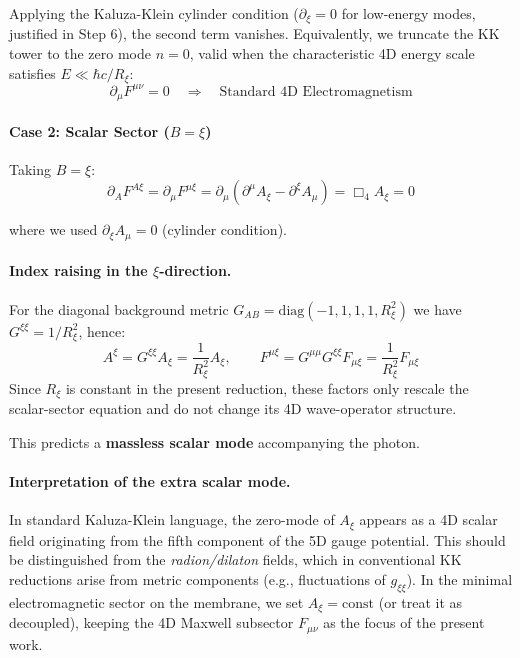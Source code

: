 Applying the Kaluza-Klein cylinder condition ($\partial_\xi = 0$ for low-energy modes, justified in Step 6), the second term vanishes. Equivalently, we truncate the KK tower to the zero mode $n=0$, valid when the characteristic 4D energy scale satisfies $E \ll \hbar c / R_\xi$:
\begin{equation}
\boxed{\partial_\mu F^{\mu\nu} = 0} \quad \Longrightarrow \quad \text{Standard 4D Electromagnetism}
\end{equation}

\paragraph{Case 2: Scalar Sector ($B = \xi$)}

Taking $B = \xi$:
\begin{equation}
\partial_A F^{A\xi} = \partial_\mu F^{\mu\xi} = \partial_\mu(\partial^\mu A_\xi - \partial^\xi A_\mu) = \Box_4 A_\xi = 0
\end{equation}

where we used $\partial_\xi A_\mu = 0$ (cylinder condition).

\paragraph{Index raising in the $\xi$-direction.}
For the diagonal background metric $G_{AB} = \text{diag}(-1,1,1,1,R_\xi^2)$ we have $G^{\xi\xi} = 1/R_\xi^2$, hence:
\begin{equation}
A^\xi = G^{\xi\xi}A_\xi = \frac{1}{R_\xi^2}A_\xi, \qquad F^{\mu\xi} = G^{\mu\mu}G^{\xi\xi}F_{\mu\xi} = \frac{1}{R_\xi^2}F_{\mu\xi}
\end{equation}
Since $R_\xi$ is constant in the present reduction, these factors only rescale the scalar-sector equation and do not change its 4D wave-operator structure.

This predicts a \textbf{massless scalar mode} accompanying the photon.

\paragraph{Interpretation of the extra scalar mode.}
In standard Kaluza-Klein language, the zero-mode of $A_\xi$ appears as a 4D scalar field originating from the fifth component of the 5D gauge potential. This should be distinguished from the \textit{radion/dilaton} fields, which in conventional KK reductions arise from metric components (e.g., fluctuations of $g_{\xi\xi}$). In the minimal electromagnetic sector on the membrane, we set $A_\xi = \text{const}$ (or treat it as decoupled), keeping the 4D Maxwell subsector $F_{\mu\nu}$ as the focus of the present work.

